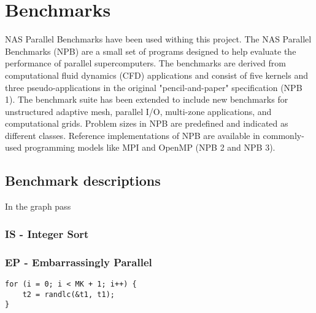 \chapter{Benchmarks} \label{benchmarks}
\qquad NAS Parallel Benchmarks have been used withing this project. The NAS Parallel Benchmarks (NPB) are a small set of programs designed to help evaluate the performance of parallel supercomputers. The benchmarks are derived from computational fluid dynamics (CFD) applications and consist of five kernels and three pseudo-applications in the original "pencil-and-paper" specification (NPB 1). The benchmark suite has been extended to include new benchmarks for unstructured adaptive mesh, parallel I/O, multi-zone applications, and computational grids.  Problem sizes in NPB are predefined and indicated as different classes. Reference implementations of NPB are available in commonly-used programming models like MPI and OpenMP (NPB 2 and NPB 3).

\section{Benchmark descriptions} 
In the graph pass

\subsection{IS - Integer Sort}


\subsection{EP - Embarrassingly Parallel}

\begin{lstlisting}[frame=single]
for (i = 0; i < MK + 1; i++) {
	t2 = randlc(&t1, t1);
}
\end{lstlisting}
